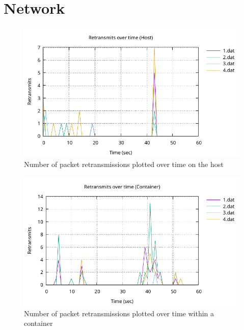 

\section{Network}
\label{ch:experiment/network}

\begin{figure}[H]
    \centering
    \includegraphics[width=1\textwidth]{images/results/network-host-retransmits.pdf}
    \caption{Number of packet retransmissions plotted over time on the host}
    \label{ticket-builder-class}
\end{figure}

\begin{figure}[H]
    \centering
    \includegraphics[width=1\textwidth]{images/results/network-retransmits-container.pdf}
    \caption{Number of packet retransmissions plotted over time within a container}
    \label{ticket-builder-class}
\end{figure}

